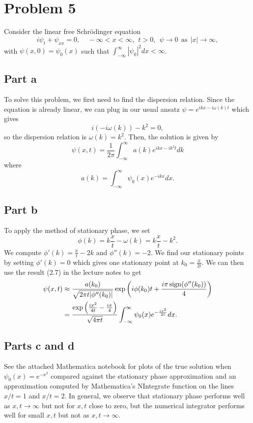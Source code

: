 \documentclass{article}
\begin{document}
\section{Problem 5}
Consider the linear free Schr\"odinger equation
$$
i \psi_t+\psi_{xx}=0, ~~~~~-\infty<x<\infty,~~t>0, ~~\psi\rightarrow 0
~~\mbox{as}~~ |x|\rightarrow \infty,
$$
with $\psi(x,0)=\psi_0(x)$ such that $\int_{-\infty}^\infty|\psi_0|^2
dx<\infty$.
\subsection{Part a}
To solve this problem, we first need to find the dispersion relation. Since the equation is already linear, we can plug in our usual ansatz $\psi=e^{ikx-i\omega(k)t}$ which gives
\[
i(-i\omega(k))-k^2=0,
\]
so the dispersion relation is $\omega(k)=k^2$. Then, the solution is given by
\[
\psi(x,t)=\frac{1}{2\pi}\int_{-\infty}^{\infty}a(k)e^{ikx-ik^2t}dk
\]
where 
\[
a(k)=\int_{-\infty}^{\infty}\psi_0(x)e^{-ikx}dx.
\]
\subsection{Part b}
To apply the method of stationary phase, we set 
\[
\phi(k)=k\frac{x}{t}-\omega(k)=k\frac{x}{t}-k^2.
\]
We compute $\phi'(k)=\frac{x}{t}-2k$ and $\phi''(k)=-2$. We find our stationary points by setting $\phi'(k)=0$ which gives one stationary point at $k_0=\frac{x}{2t}$. We can then use the result (2.7) in the lecture notes to get 
\begin{align*}
\psi(x,t)&\approx\frac{a(k_0)}{\sqrt{2\pi t|\phi''(k_0)|}}\exp\left(i\phi(k_0)t+\frac{i\pi\operatorname{sign}(\phi''(k_0))}{4}\right)\\&=
\frac{\exp\left(\frac{ix^2}{4t}-\frac{i\pi}{4}\right)}{\sqrt{4\pi t}}\int_{-\infty}^{\infty}\psi_0(x)e^{-\frac{ix^2}{2t}}dx.
\end{align*}
\subsection{Parts c and d}
See the attached Mathematica notebook for plots of the true solution when $\psi_0(x)=e^{-x^2}$ compared against the stationary phase approximation and an approximation computed by Mathematica's NIntegrate function on the lines $x/t=1$ and $x/t=2$. In general, we observe that stationary phase performs well as $x,t\to\infty$ but not for $x,t$ close to zero, but the numerical integrator performs well for small $x,t$ but not as $x,t\to\infty$.
\end{document}
